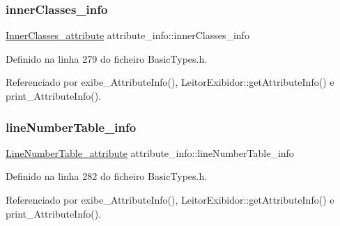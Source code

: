 \mbox{\label{structattribute__info_ab17c5c178068ef13e7f6d61e741bc398}} 
\subsubsection{\texorpdfstring{inner\+Classes\+\_\+info}{innerClasses\_info}}
{\footnotesize\ttfamily \hyperlink{structInnerClasses__attribute}{Inner\+Classes\+\_\+attribute} attribute\+\_\+info\+::inner\+Classes\+\_\+info}



Definido na linha 279 do ficheiro Basic\+Types.\+h.



Referenciado por exibe\+\_\+\+Attribute\+Info(), Leitor\+Exibidor\+::get\+Attribute\+Info() e print\+\_\+\+Attribute\+Info().

\mbox{\label{structattribute__info_a184f00b0276336a22f3a41e55df6ecf9}} 
\subsubsection{\texorpdfstring{line\+Number\+Table\+\_\+info}{lineNumberTable\_info}}
{\footnotesize\ttfamily \hyperlink{structLineNumberTable__attribute}{Line\+Number\+Table\+\_\+attribute} attribute\+\_\+info\+::line\+Number\+Table\+\_\+info}



Definido na linha 282 do ficheiro Basic\+Types.\+h.



Referenciado por exibe\+\_\+\+Attribute\+Info(), Leitor\+Exibidor\+::get\+Attribute\+Info() e print\+\_\+\+Attribute\+Info().

\mbox{\label{structattribute__info_a98095c1c653f2dd7e6f11330967829e8}} 
